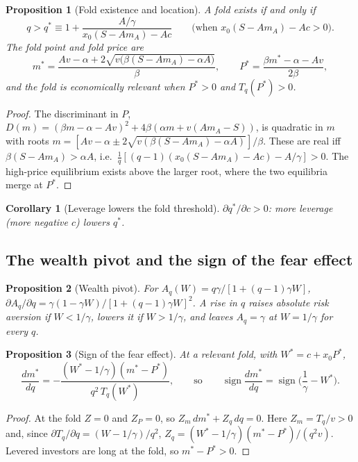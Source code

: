 \documentclass[11pt,a4paper]{article}
\newtheorem{proposition}{Proposition}
\newtheorem{corollary}{Corollary}
\theoremstyle{remark}
\begin{document}
\begin{proposition}[Fold existence and location]\label{prop:fold}
A fold exists if and only if
\[
q>q^*\equiv1+\frac{A/\gamma}{x_0(S-Am_A)-Ac}\qquad\big(\text{when } x_0(S-Am_A)-Ac>0\big).
\]
The fold point and fold price are
\[
m^*=\frac{Av-\alpha+2\sqrt{v\big(\beta(S-Am_A)-\alpha A\big)}}{\beta},\qquad
P^*=\frac{\beta m^*-\alpha-Av}{2\beta},
\]
and the fold is economically relevant when $P^*>0$ and $T_q(P^*)>0$.
\end{proposition}
\begin{proof}
The discriminant in $P$, $D(m)=(\beta m-\alpha-Av)^2+4\beta(\alpha m+v(Am_A-S))$, is
quadratic in $m$ with roots $m=[Av-\alpha\pm2\sqrt{v(\beta(S-Am_A)-\alpha A)}]/\beta$. These
are real iff $\beta(S-Am_A)>\alpha A$, i.e.\
$\frac1q[(q-1)(x_0(S-Am_A)-Ac)-A/\gamma]>0$. The high-price equilibrium exists above the
larger root, where the two equilibria merge at $P^*$.
\end{proof}

\begin{corollary}[Leverage lowers the fold threshold]\label{cor:lev}
$\partial q^*/\partial c>0$: more leverage (more negative $c$) lowers $q^*$.
\end{corollary}

\subsection{The wealth pivot and the sign of the fear effect}

\begin{proposition}[Wealth pivot]\label{prop:pivot}
For $A_q(W)=q\gamma/[1+(q-1)\gamma W]$,
$\partial A_q/\partial q=\gamma(1-\gamma W)/[1+(q-1)\gamma W]^2$. A rise in $q$ raises
absolute risk aversion if $W<1/\gamma$, lowers it if $W>1/\gamma$, and leaves $A_q=\gamma$
at $W=1/\gamma$ for every $q$.
\end{proposition}

\begin{proposition}[Sign of the fear effect]\label{prop:sign}
At a relevant fold, with $W^*=c+x_0P^*$,
\[
\frac{dm^*}{dq}=-\frac{(W^*-1/\gamma)(m^*-P^*)}{q^2\,T_q(W^*)},
\qquad\text{so}\qquad
\operatorname{sign}\frac{dm^*}{dq}=\operatorname{sign}\Big(\frac1\gamma-W^*\Big).
\]
\end{proposition}
\begin{proof}
At the fold $Z=0$ and $Z_P=0$, so $Z_m\,dm^*+Z_q\,dq=0$. Here $Z_m=T_q/v>0$ and, since
$\partial T_q/\partial q=(W-1/\gamma)/q^2$, $Z_q=(W^*-1/\gamma)(m^*-P^*)/(q^2v)$. Levered
investors are long at the fold, so $m^*-P^*>0$.
\end{proof}
\end{document}
